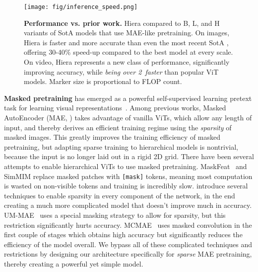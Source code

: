 \documentclass[nohyperref]{article}
\renewcommand{\paragraph}[1]{\vspace{1.25mm}\noindent\textbf{#1}}
\newcommand{\img}[1]{\textcolor{imgcolor}{#1}}
\newcommand{\vid}[1]{\textcolor{vidcolor}{#1}}
\newcommand{\shortname}{{Hiera}}
\theoremstyle{plain}
\theoremstyle{definition}
\theoremstyle{remark}
\begin{document}
\begin{figure}[t]
    \centering
    \texttt{[image: fig/inference\_speed.png]}
    \vspace{-2em}
    \caption{\textbf{Performance vs. prior work.} \shortname{} compared to B, L, and H variants of SotA models that use MAE-like pretraining. On \img{images}, \shortname{} is faster and more accurate than even the most recent SotA \cite{mae,gao2022mcmae,woo2023convnextv2}, offering 30-40\% speed-up compared to the best model at every scale. On \vid{video}, \shortname{} represents a new class of performance, significantly improving accuracy, while \textit{being over 2\x~faster} than popular ViT models.
    Marker size is proportional to FLOP count.
    }
    \label{fig:imnet1k_inference_speed}
\end{figure}


\paragraph{Masked pretraining} has emerged as a powerful self-supervised learning pretext task for learning visual representations~\cite{vincent2010stacked,pathak2016context,chen2020generative,mae,bao2021beit,xie2021simmim,milan}. Among previous works, Masked AutoEncoder (MAE, \citet{mae}) takes advantage of vanilla ViTs, which allow any length of input, and thereby derives an efficient training regime using the \emph{sparsity} of masked images. This greatly improves the training efficiency of masked pretraining, but adapting sparse training to hierarchical models is nontrivial, 
because the input is no longer laid out in a rigid 2D grid. 
There have been several attempts to enable hierarchical ViTs to use masked pretraining. MaskFeat~\cite{maskfeat} and SimMIM \cite{xie2021simmim} replace masked patches with \texttt{[mask]} tokens, meaning most computation is wasted on non-visible tokens and training is incredibly slow.
\citet{huang2022green} introduce several techniques to enable sparsity in every component of the network, in the end creating a much more complicated model that doesn't improve much in accuracy.  UM-MAE~\cite{li2022uniform} uses a special masking strategy to allow for sparsity, but this restriction significantly hurts accuracy.
MCMAE~\cite{gao2022mcmae} uses masked convolution in the first couple of stages which obtains high accuracy but significantly reduces the efficiency of the model overall. We bypass all of these complicated techniques and restrictions by designing our architecture specifically for \textit{sparse} MAE pretraining, thereby creating a powerful yet simple model.
\end{document}
